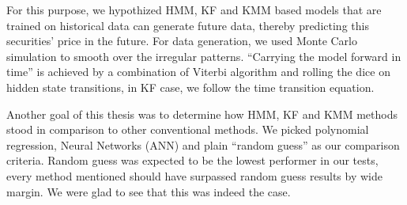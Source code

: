 For this purpose, we hypothized HMM, KF and KMM based models that are trained on
historical data can generate future data, thereby predicting this securities'
price in the future. For data generation, we used Monte Carlo simulation to
smooth over the irregular patterns. ``Carrying the model forward in time'' is
achieved by a combination of Viterbi algorithm and rolling the dice on hidden
state transitions, in KF case, we follow the time transition equation.

Another goal of this thesis was to determine how HMM, KF and KMM methods stood
in comparison to other conventional methods. We picked polynomial regression,
Neural Networks (ANN) and plain ``random guess'' as our comparison
criteria. Random guess was expected to be the lowest performer in our tests,
every method mentioned should have surpassed random guess results by wide
margin. We were glad to see that this was indeed the case.

\newpage

\tableofcontents
\listoffigures
\listoftables




